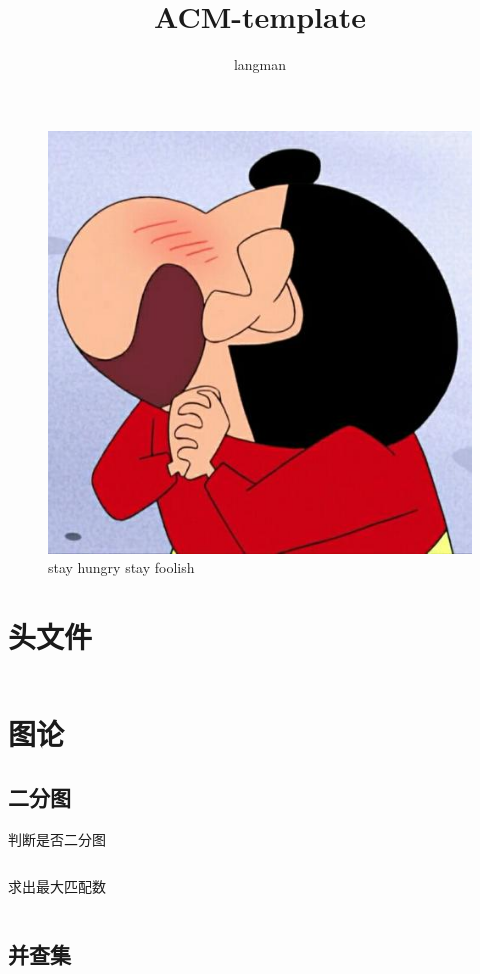\documentclass[a4paper,13.6pt]{article}
\author{langman}
\title{ACM-template}
\begin{document}
\maketitle
\vspace{3cm}
\begin{CJK}{UTF8}{gbsn}
    \begin{figure}[!htb]
      \begin{center}
        \includegraphics[width=0.80\linewidth]{../scoure/tupian.jpg}
        \caption{stay hungry stay foolish}
      \end{center}
    \end{figure}
\newpage

\tableofcontents
\newpage
\section{头文件}
\inputminted{c++}{../scoure/head.cpp}
\newpage
\section{图论}
\subsection{二分图}
判断是否二分图
\inputminted{c++}{../scoure/Graph_theory/pan2fen.cpp}
求出最大匹配数
\inputminted{c++}{../scoure/Graph_theory/2fentu.cpp}
\subsection{并查集}
\inputminted{c++}{../scoure/Graph_theory/bingchick.cpp}
\newpage

\end{CJK}
\end{document}
